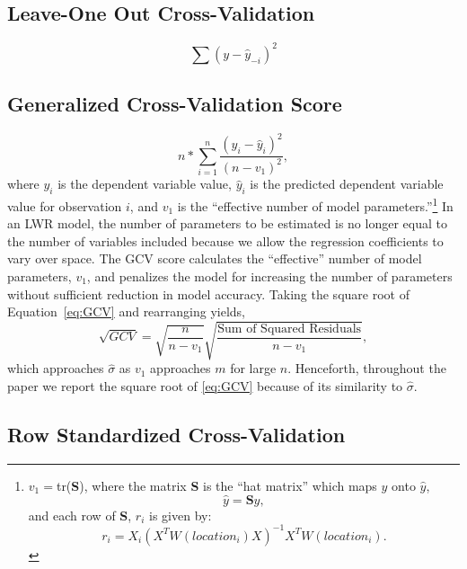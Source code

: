 \documentclass{article}
\begin{document}
\subsection{Leave-One Out Cross-Validation}

\begin{equation}
\sum (y - \hat{y}_{-i})^2
\end{equation}

\subsection{Generalized Cross-Validation Score}
\begin{equation}\label{eq:GCV}
  n*\sum_{i=1}^{n}\frac{(y_i-\hat{y}_i)^2}{(n-v_1)^2}, 
  \end{equation}
where $y_i$ is the dependent variable value, $\hat{y}_i$ is the predicted dependent variable value for observation $i$, and $v_1$ is the ``effective number of model parameters.''\footnote{
  $v_1=$tr(\textbf{S}), where the matrix \textbf{S} is the ``hat matrix'' which maps $y$ onto $\hat{y}$,
\begin{equation*}
  \hat{y}=\textbf{S}y,
  \end{equation*}
  and each row of \textbf{S}, $r_i$ is given by:
  \begin{equation*}
    r_i=X_i(X^TW(location_i)X)^{-1}X^TW(location_i).
    \end{equation*}
}
In an LWR model, the number of parameters to be estimated is no longer equal to the number of variables included because we allow the regression coefficients to vary over space. The GCV score calculates the ``effective'' number of model parameters, $v_1$, and penalizes the model for increasing the number of parameters without sufficient reduction in model accuracy. Taking the square root of Equation~\eqref{eq:GCV} and rearranging yields,
\begin{equation}
  \sqrt{GCV}=\sqrt{\frac{n}{n-v_1}} \sqrt{\frac{\textrm{Sum of Squared Residuals}}{n-v_1}},
\end{equation}
which approaches $\hat{\sigma}$ as $v_1$ approaches $m$ for large $n$. Henceforth, throughout the paper we report the square root of \eqref{eq:GCV} because of its similarity to $\hat{\sigma}$.  

\subsection{Row Standardized Cross-Validation}
\end{document}
